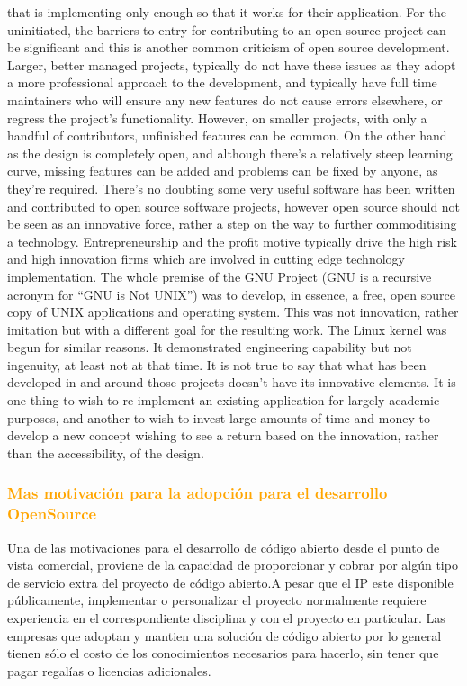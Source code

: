 that is implementing only enough so that it works for their application. For the
uninitiated, the barriers to entry for contributing to an open source project can
be significant and this is another common criticism of open source development.
Larger, better managed projects, typically do not have these issues as they adopt a
more professional approach to the development, and typically have full time maintainers
who will ensure any new features do not cause errors elsewhere, or regress
the project’s functionality. However, on smaller projects, with only a handful of
contributors, unfinished features can be common. On the other hand as the design
is completely open, and although there’s a relatively steep learning curve, missing
features can be added and problems can be fixed by anyone, as they’re required.
There’s no doubting some very useful software has been written and contributed
to open source software projects, however open source should not be seen as an innovative
force, rather a step on the way to further commoditising a technology.
Entrepreneurship and the profit motive typically drive the high risk and high innovation
firms which are involved in cutting edge technology implementation. The
whole premise of the GNU Project (GNU is a recursive acronym for “GNU is Not
UNIX”) was to develop, in essence, a free, open source copy of UNIX applications
and operating system. This was not innovation, rather imitation but with a different
goal for the resulting work. The Linux kernel was begun for similar reasons.
It demonstrated engineering capability but not ingenuity, at least not at that time.
It is not true to say that what has been developed in and around those projects
doesn’t have its innovative elements. It is one thing to wish to re-implement an
existing application for largely academic purposes, and another to wish to invest
large amounts of time and money to develop a new concept wishing to see a return
based on the innovation, rather than the accessibility, of the design.

		\subsubsection{\textcolor{orange}{Mas motivación para la adopción para el desarrollo OpenSource}}

Una de las motivaciones para el desarrollo de código abierto desde el punto de vista comercial,  proviene de la capacidad de proporcionar y cobrar por algún tipo de servicio extra del proyecto de código abierto.A pesar que el IP este disponible públicamente, implementar o personalizar el proyecto normalmente requiere experiencia en el correspondiente disciplina y con el proyecto en particular. Las empresas que adoptan y mantien una solución de código abierto por lo general tienen sólo el costo de los conocimientos necesarios para hacerlo, sin tener que pagar regalías o licencias adicionales.  

